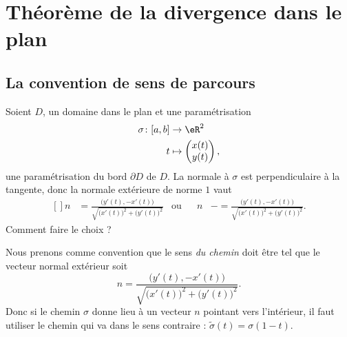 \section{Théorème de la divergence dans le plan}

\subsection{La convention de sens de parcours}

Soient $D$, un domaine dans le plan et une paramétrisation
\begin{equation}
    \begin{aligned}
        \sigma\colon \mathopen[ a , b \mathclose]&\to \eR^2 \\
        t&\mapsto \begin{pmatrix}
            x(t)    \\ 
            y(t)    
        \end{pmatrix},
    \end{aligned}
\end{equation}
une paramétrisation du bord $\partial D$ de $D$. La normale à $\sigma$ est perpendiculaire à la tangente, donc la normale extérieure de norme $1$ vaut
\begin{equation}
    \begin{aligned}[]
        n&=\frac{ \big( y'(t),-x'(t) \big) }{ \sqrt{ \big( x'(t)\big)^2+\big( y'(t) \big)^2  } }&\text{ou}&&n&-=\frac{ \big( y'(t),-x'(t) \big) }{ \sqrt{ \big( x'(t)\big)^2+\big( y'(t) \big)^2  } }.
    \end{aligned}
\end{equation}
Comment faire le choix ?

Nous prenons comme convention que le sens \emph{du chemin} doit être tel que le vecteur normal extérieur soit
\begin{equation}
        n=\frac{ \big( y'(t),-x'(t) \big) }{ \sqrt{ \big( x'(t)\big)^2+\big( y'(t) \big)^2  } }.
\end{equation}
Donc si le chemin $\sigma$ donne lieu à un vecteur $n$ pointant vers l'intérieur, il faut utiliser le chemin qui va dans le sens contraire : $\tilde \sigma(t)=\sigma(1-t)$.

